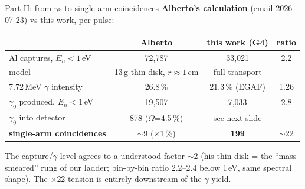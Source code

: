 \documentclass[aspectratio=169,11pt]{beamer}
\newcommand{\good}[1]{\textcolor{caqua}{#1}}
\newcommand{\bad}[1]{\textcolor{corange}{#1}}
\begin{document}
\begin{frame}{Part II: from $\gamma$s to single-arm coincidences}
  \small
  \textbf{Alberto's calculation} (email 2026-07-23) vs this work, per pulse:
  \medskip

  \centering
  \begin{tabular}{lccc}
    \toprule
    & Alberto & this work (G4) & ratio \\
    \midrule
    Al captures, $E_n<1$\,eV & 72{,}787 & 33{,}021 & 2.2 \\
    \quad model & 13\,g thin disk, $r\!\approx\!1$\,cm & full transport & \\
    7.72\,MeV $\gamma$ intensity & 26.8\,\% & 21.3\,\% (EGAF) & 1.26 \\
    $\gamma_0$ produced, $E_n<1$\,eV & 19{,}507 & 7{,}033 & 2.8 \\
    $\gamma_0$ into detector & 878 ($\Omega$=4.5\,\%) & see next slide & \\
    \textbf{single-arm coincidences} & $\sim$9 ($\times$1\,\%) & \textbf{199} & \bad{$\sim$22} \\
    \bottomrule
  \end{tabular}
  \medskip

  \raggedright
  The capture/$\gamma$ level \good{agrees to a understood factor $\sim$2}
  (his thin disk = the ``mass-smeared'' rung of our ladder; bin-by-bin ratio
  2.2--2.4 below 1\,eV, same spectral shape). The \bad{$\times$22 tension} is
  entirely downstream of the $\gamma$ yield.
\end{frame}
\end{document}
